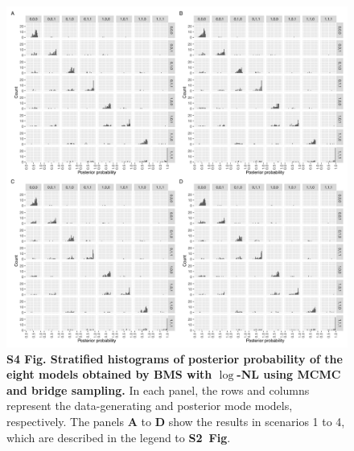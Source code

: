 \documentclass[11pt]{article}
\newcommand{\sfigroccmcmc}{\textbf{S2~Fig}\xspace}
\begin{document}
\begin{figure}[!ht]
\begin{center}
  \includegraphics[width=1\textwidth]{png/sim_hist_mcmc_bs_nl.png}
\end{center}  
\caption{
  {\bf
    S4 Fig.
    Stratified histograms of posterior probability of the eight models obtained by BMS with $\log$-NL using MCMC and bridge sampling.}
In each panel, the rows and columns represent the data-generating and posterior mode models, respectively. The panels \textbf{A} to \textbf{D} show the results in scenarios 1 to 4, which are described in the legend to \sfigroccmcmc.
}
\label{s-fig:sim-hist-mcmc-nl}
\end{figure}
\end{document}
